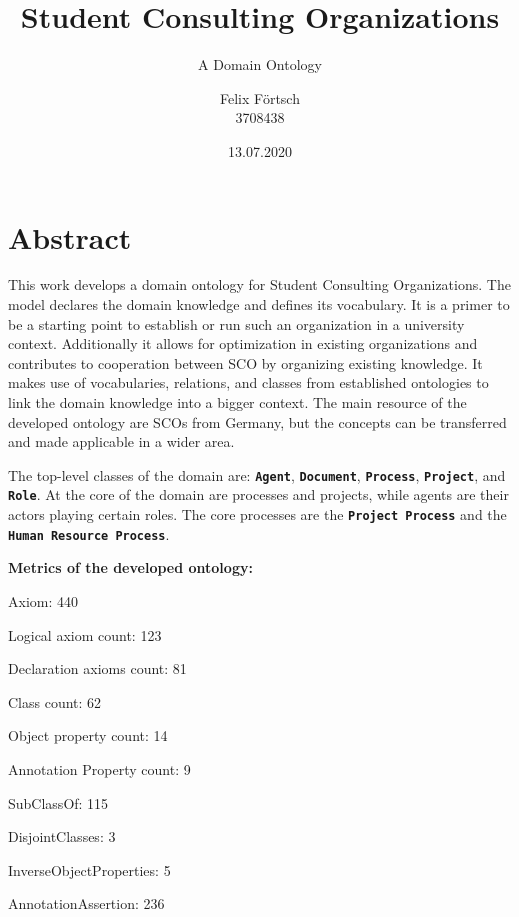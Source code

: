 \documentclass[a4paper, DIV=13, BCOR=0cm]{scrbook}
\newcommand{\class}[1]{\texttt{\textbf{#1}}}
\begin{document}
\subject{Bachelor's Thesis}
\title{Student Consulting Organizations}
\subtitle{A Domain Ontology}
\author{Felix Förtsch \\ 3708438 }
\date{13.07.2020}
\publishers{Leipzig University \vspace{8cm} \\
	Supervised by: \\
	Prof. Dr. Heinrich Herre \\
	Dr. Frank Loebe}
\maketitle

\frontmatter
\chapter*{Abstract}
This work develops a domain ontology for Student Consulting Organizations. The model declares the domain knowledge and defines its vocabulary. It is a primer to be a starting point to establish or run such an organization in a university context. Additionally it allows for optimization in existing organizations and contributes to cooperation between SCO by organizing existing knowledge. It makes use of vocabularies, relations, and classes from established ontologies to link the domain knowledge into a bigger context. The main resource of the developed ontology are SCOs from Germany, but the concepts can be transferred and made applicable in a wider area.

The top-level classes of the domain are: \class{Agent}, \class{Document}, \class{Process}, \class{Project}, and \class{Role}. At the core of the domain are processes and projects, while agents are their actors playing certain roles. The core processes are the \class{Project Process} and the \class{Human Resource Process}.

\textbf{Metrics of the developed ontology:}
\begin{compactitem}
	\item Axiom: 440
	\item Logical axiom count: 123
	\item Declaration axioms count: 81
	\item Class count: 62
	\item Object property count: 14
	\item Annotation Property count: 9
	\item SubClassOf: 115
	\item DisjointClasses: 3
	\item InverseObjectProperties: 5
	\item AnnotationAssertion: 236
\end{compactitem}
\end{document}
